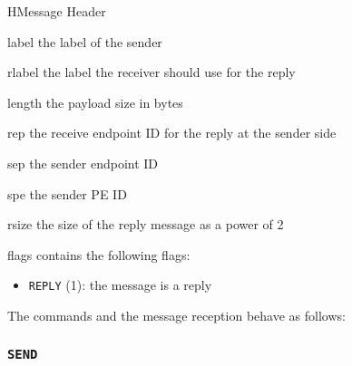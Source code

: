 \documentclass[a4paper,11pt,draft]{article}
\begin{document}
\begin{register}{H}{Message Header}{}
  \regnewline%
  \regnewline%
  \begin{regdesc}\begin{reglist}
    \item[label] the label of the sender
    \item[rlabel] the label the receiver should use for the reply
    \item[length] the payload size in bytes
    \item[rep] the receive endpoint ID for the reply at the sender side
    \item[sep] the sender endpoint ID
    \item[spe] the sender PE ID
    \item[rsize] the size of the reply message as a power of 2
    \item[flags] contains the following flags:
    \begin{itemize}
      \item \texttt{REPLY} (1): the message is a reply
    \end{itemize}
  \end{reglist}\end{regdesc}
\end{register}

\noindent The commands and the message reception behave as follows:

\subsubsection{\texttt{SEND}}
\end{document}
